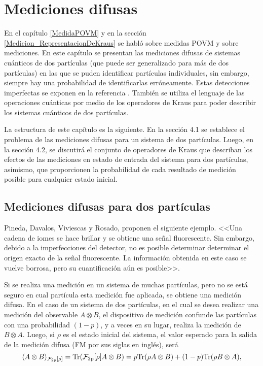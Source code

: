 \chapter{Mediciones difusas}


En el capítulo {\ref{MedidaPOVM}} y en la sección {\ref{Medicion_RepresentacionDeKraus}} se habló sobre medidas POVM y sobre mediciones. En este capítulo se presentan las mediciones difusas de sistemas cuánticos de dos partículas (que puede ser generalizado para más de dos partículas) en las que se puden identificar partículas individuales, sin embargo, siempre hay una probabilidad de identificarlas erróneamente. Estas detecciones imperfectas se exponen en la referencia {\cite{Pineda_2021}}. También se utiliza el lenguaje de las operaciones cuánticas por medio de los operadores de Kraus para poder describir los sistemas cuánticos de dos partículas.

La estructura de este capítulo es la siguiente. En la sección 4.1 se establece el problema de las mediciones difusas para un sistema de dos partículas. Luego, en la sección 4.2, se discutirá el conjunto de operadores de Kraus que describan los efectos de las mediciones en estado de entrada del sistema para dos partículas, asimismo, que proporcionen la probabilidad de cada resultado de medición posible para cualquier estado inicial.



\section{Mediciones difusas para dos partículas}

Pineda, Davalos, Viviescas y Rosado, proponen el siguiente ejemplo. <<Una cadena de iomes se hace brillar  y se obtiene una señal fluorescente. Sin embargo, debido a la imperfecciones del detector, no es posible determinar
determinar el origen exacto de la señal fluorescente. La información obtenida en este caso se vuelve borrosa, pero su cuantificación aún es posible>>.

Si se  realiza una  medición en un sistema de muchas partículas, pero no se está seguro en cual partícula esta medición fue aplicada, se obtiene una medición difusa. En el caso de un sistema de dos partículas, en el cual se desea realizar una medición del observable $A\otimes B$, el dispositivo de medición confunde las partículas con una probabilidad $(1-p)$, y a veces en su lugar, realiza la medición de $B\otimes A$. Luego, si $\rho$ es el estado inicial del sistema, el valor esperado para la salida de la medición difusa (FM por sus siglas en inglés), será {\cite{Pineda_2021}}  \[\langle A\otimes B\rangle_{\mathcal{F_{\text{2p}}[\rho]}}={\rm Tr}(\mathcal{F_{\text{2p}}[\rho]}A\otimes B)=p{\rm Tr}(\rho A\otimes B)+(1-p){\rm Tr}(\rho B\otimes A),\]


